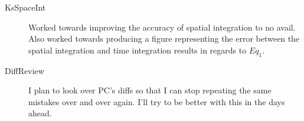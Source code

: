 \begin{description}
{\begin{description}
\item[KsSpaceInt]
Worked towards improving the accuracy of spatial integration to no avail. Also worked towards producing
a figure representing the error between the spatial integration and time integration results in regards
to $Eq_1$.

\item[DiffReview]
I plan to look over PC's diffs so that I can stop repeating the same mistakes over and over again. I'll try
to be better with this in the days ahead.

\end{description}
}



\end{description}
